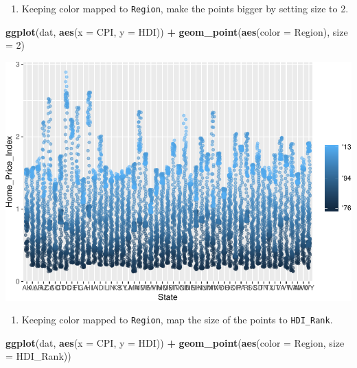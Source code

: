 \documentclass[
]{book}
\newenvironment{Shaded}{\begin{snugshade}}{\end{snugshade}}
\newcommand{\DataTypeTok}[1]{\textcolor[rgb]{0.13,0.29,0.53}{#1}}
\newcommand{\DecValTok}[1]{\textcolor[rgb]{0.00,0.00,0.81}{#1}}
\newcommand{\KeywordTok}[1]{\textcolor[rgb]{0.13,0.29,0.53}{\textbf{#1}}}
\newcommand{\NormalTok}[1]{#1}
\newcommand{\OperatorTok}[1]{\textcolor[rgb]{0.81,0.36,0.00}{\textbf{#1}}}
\newcommand{\StringTok}[1]{\textcolor[rgb]{0.31,0.60,0.02}{#1}}
\providecommand{\tightlist}{%
  \setlength{\itemsep}{0pt}\setlength{\parskip}{0pt}}
\begin{document}
\begin{alert}
\begin{enumerate}
\def\labelenumi{\arabic{enumi}.}
\setcounter{enumi}{3}
\tightlist
\item
  Keeping color mapped to \texttt{Region}, make the points bigger by setting size to 2.
\end{enumerate}

\begin{Shaded}
\begin{Highlighting}[]
\KeywordTok{ggplot}\NormalTok{(dat, }\KeywordTok{aes}\NormalTok{(}\DataTypeTok{x =}\NormalTok{ CPI, }\DataTypeTok{y =}\NormalTok{ HDI)) }\OperatorTok{+}
\StringTok{  }\KeywordTok{geom\_point}\NormalTok{(}\KeywordTok{aes}\NormalTok{(}\DataTypeTok{color =}\NormalTok{ Region), }\DataTypeTok{size =} \DecValTok{2}\NormalTok{)}
\end{Highlighting}
\end{Shaded}

\includegraphics{R/Rgraphics/figures/unnamed-chunk-174-1.pdf}

\begin{enumerate}
\def\labelenumi{\arabic{enumi}.}
\setcounter{enumi}{4}
\tightlist
\item
  Keeping color mapped to \texttt{Region}, map the size of the points to \texttt{HDI\_Rank}.
\end{enumerate}

\begin{Shaded}
\begin{Highlighting}[]
\KeywordTok{ggplot}\NormalTok{(dat, }\KeywordTok{aes}\NormalTok{(}\DataTypeTok{x =}\NormalTok{ CPI, }\DataTypeTok{y =}\NormalTok{ HDI)) }\OperatorTok{+}
\KeywordTok{geom\_point}\NormalTok{(}\KeywordTok{aes}\NormalTok{(}\DataTypeTok{color =}\NormalTok{ Region, }\DataTypeTok{size =}\NormalTok{  HDI\_Rank))}
\end{Highlighting}
\end{Shaded}


\end{alert}
\end{document}
